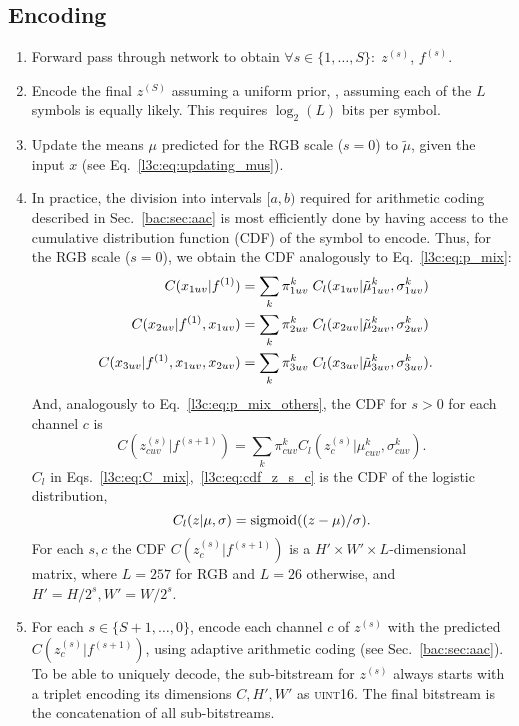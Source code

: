 \begin{subappendices}
\subsection*{Encoding}
\begin{enumerate}[leftmargin=*]
    \item Forward pass through network to obtain $\forall s \in \{1,\dots,S\}: \; z^{(s)}$, $f^{(s)}$.
    \item Encode the final $z^{(S)}$ assuming a uniform prior, \ie, assuming each of the $L$ symbols is equally likely. This requires $\log_2(L)$ bits per symbol.
    \item Update the means $\mu$ predicted for the RGB scale ($s=0$) to $\tilde \mu$, given the input $x$ (see Eq.~\eqref{l3c:eq:updating_mus}).
    \item In practice, the division into intervals $[a,b)$ required for arithmetic coding described in Sec.~\ref{bac:sec:aac} is most efficiently done by having access to the cumulative distribution function (CDF) of the symbol to encode.  
        Thus, for the RGB scale ($s=0$), we obtain the CDF analogously to Eq.~\eqref{l3c:eq:p_mix}:
        \begin{align}
            \hspace{-2ex}C(x_{1uv} | f^{(1)}) &= \sum_k \pi^k_{1uv} \; C_l(x_{1uv} | \tilde \mu^k_{1uv}, \sigma^k_{1uv}) \nonumber \\
            \hspace{-2ex}C(x_{2uv} | f^{(1)}, x_{1uv}) &= \sum_k \pi^k_{2uv} \; C_l(x_{2uv} | \tilde \mu^k_{2uv}, \sigma^k_{2uv}) \nonumber \\
            \hspace{-2ex}C(x_{3uv} | f^{(1)}, x_{1uv}, x_{2uv}) &= \sum_k \pi^k_{3uv} \; C_l(x_{3uv} | \tilde \mu^k_{3uv}, \sigma^k_{3uv}). \label{l3c:eq:C_mix}
\end{align}
        And, analogously to Eq.~\eqref{l3c:eq:p_mix_others}, the CDF for $s>0$ for each channel $c$ is
        \begin{equation}
            C(z^{(s)}_{cuv} | f^{(s+1)}) = \sum_k \pi^k_{cuv} C_l(z^{(s)}_c | \mu^k_{cuv}, \sigma^k_{cuv}).
            \label{l3c:eq:cdf_z_s_c}
        \end{equation}
        $C_l$ in Eqs.~\eqref{l3c:eq:C_mix},~\eqref{l3c:eq:cdf_z_s_c} is the CDF of the logistic distribution, \[ C_l(z | \mu, \sigma) = \text{sigmoid}((z-\mu)/\sigma). \]
        For each $s, c$ the CDF $C(z^{(s)}_{c} | f^{(s+1)})$ is a $H' \times W' \times L$-dimensional matrix, where $L=257$ for RGB and $L=26$ otherwise, and $H' = H/2^s, W' = W/2^s$. 
%
    \item For each $s \in \{S+1, \dots, 0\}$, encode each channel $c$ of $z^{(s)}$ with the predicted $C(z^{(s)}_{c} | f^{(s+1)})$, using adaptive arithmetic coding (see Sec.~\ref{bac:sec:aac}). To be able to uniquely decode, the sub-bitstream for $z^{(s)}$ always starts with a triplet encoding its dimensions $C, H', W'$ as \textsc{uint16}. The final bitstream is the concatenation of all sub-bitstreams.
\end{enumerate}


\end{subappendices}
